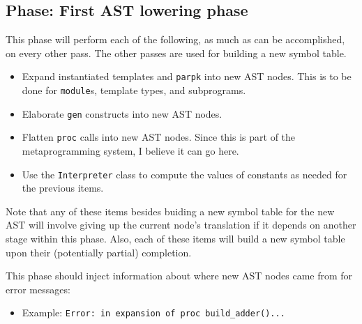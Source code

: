 \documentclass{article}
\begin{document}
	\subsection{Phase:  First AST lowering phase}
		This phase will perform each of the following, as much as can be
		accomplished, on every other pass.  The other passes are used for
		building a new symbol table.
		\begin{itemize}
		\item Expand instantiated templates and \texttt{parpk} into new AST
			nodes.  This is to be done for \texttt{module}s, template types,
			and subprograms.
		\item Elaborate \texttt{gen} constructs into new AST nodes.
		\item Flatten \texttt{proc} calls into new AST nodes.  Since
			this is part of the metaprogramming system, I believe it
			can go here.
		\item Use the \texttt{Interpreter} class to compute the values of
			constants as needed for the previous items.
		\end{itemize}
		Note that any of these items besides buiding a new symbol table for
		the new AST will involve giving up the current node's translation
		if it depends on another stage within this phase.  Also, each of
		these items will build a new symbol table upon their (potentially
		partial) completion.


		This phase should inject information about where new AST nodes came
		from for error messages:
		\begin{itemize}
		\item Example:  \texttt{Error:  in expansion of proc
			build\_adder()...}
		\end{itemize}


\end{document}
